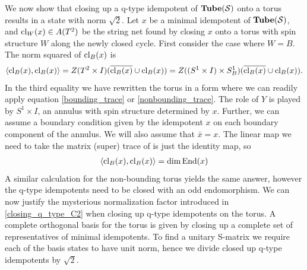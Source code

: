 We now show that closing up a q-type idempotent of $\textbf{Tube}(\mathcal{S})$ onto a torus results in a state with norm $\sqrt{2}$.
Let $x$ be a minimal idempotent of $\textbf{Tube}(\mathcal{S})$, 
and $\text{cl}_W(x) \in A(T^2)$ be the string net found by closing $x$ onto a torus with spin structure $W$ 
along the newly closed cycle. 
First consider the case where $W = B$.
The norm squared of $\text{cl}_B(x)$ is
\begin{align}
\langle \text{cl}_B(x), \text{cl}_B(x) \rangle = Z(T^2 \times I)(\overline{\text{cl}_B(x)} \cup \text{cl}_B(x)) = Z((S^1 \times I)\times S^1_B)(\overline{\text{cl}_B(x)} \cup \text{cl}_B(x)).
\end{align}
In the third equality we have rewritten the torus in a form where we can readily apply equation \eqref{bounding_trace} or \eqref{nonbounding_trace}.
The role of $Y$ is played by $S^1 \times I$, an annulus with spin structure determined by $x$.
Further, we can assume a boundary condition given by the idempotent $x$ on each boundary component of the annulus.
We will also assume that $\bar x = x$.
The linear map we need to take the matrix (super) trace of is 
just the identity map, so
\begin{align}
\langle \text{cl}_B(x), \text{cl}_B(x) \rangle = \dim \text{End}(x)
\end{align}
A similar calculation for the non-bounding torus yields the same answer, 
however the q-type idempotents need to be closed with an odd endomorphism.
We can now justify the mysterious normalization factor introduced 
in \eqref{closing_q_type_C2} when closing up q-type idempotents on the torus.
A complete orthogonal basis for the torus is given by closing up a complete set of representatives of minimal idempotents.
To find a unitary S-matrix we require each of the basis states to have unit norm,
hence we divide closed up q-type idempotents by $\sqrt{2}$.

